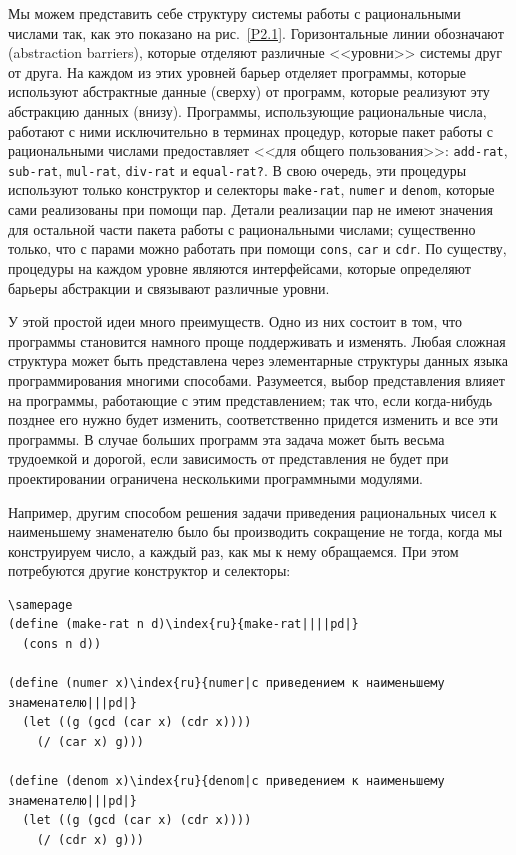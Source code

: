 Мы можем представить себе структуру системы работы с
рациональными числами так, как это показано на рис.~\ref{P2.1}.  Горизонтальные линии обозначают 
 (abstraction barriers), которые
отделяют различные <<уровни>> системы друг от друга.  На каждом из
этих уровней барьер отделяет программы, которые используют абстрактные 
данные (сверху) от программ, которые реализуют эту абстракцию данных
(внизу).  Программы, использующие рациональные числа, работают с ними
исключительно в терминах процедур, которые пакет работы с
рациональными числами предоставляет <<для общего пользования>>:
{\tt add-rat}, {\tt sub-rat}, {\tt mul-rat},
{\tt div-rat} и {\tt equal-rat?}.  В свою очередь, эти
процедуры используют только конструктор и  селекторы
{\tt make-rat}, {\tt numer} и
{\tt denom}, которые сами реализованы при помощи пар.  Детали
реализации пар не имеют значения для остальной части
пакета работы с рациональными числами; существенно только, что с
парами можно работать при помощи {\tt cons}, {\tt car} и 
{\tt cdr}.  По существу, процедуры на каждом уровне являются
интерфейсами, которые определяют барьеры абстракции и связывают
различные уровни.

У этой простой идеи много преимуществ.  Одно из них
состоит в том, что программы становится намного проще поддерживать и
изменять.  Любая сложная структура может быть представлена через
элементарные структуры данных языка программирования многими
способами.  Разумеется, выбор представления влияет на программы,
работающие с этим представлением; так что, если когда-нибудь позднее
его нужно будет изменить, соответственно придется изменить и 
все эти программы.  В случае больших программ эта задача может быть
весьма трудоемкой и дорогой, если зависимость от представления не
будет при проектировании ограничена несколькими программными
модулями.

%
%
Например, другим
способом решения задачи приведения 
рациональных чисел к наименьшему знаменателю было бы производить
сокращение не тогда, когда мы конструируем число, а каждый раз, как мы 
к нему обращаемся.  При этом потребуются другие конструктор и
селекторы: 

\begin{Verbatim}[fontsize=\small]
\samepage
(define (make-rat n d)\index{ru}{make-rat||||pd|}
  (cons n d))

(define (numer x)\index{ru}{numer|с приведением к наименьшему знаменателю|||pd|}
  (let ((g (gcd (car x) (cdr x))))
    (/ (car x) g)))

(define (denom x)\index{ru}{denom|с приведением к наименьшему знаменателю|||pd|}
  (let ((g (gcd (car x) (cdr x))))
    (/ (cdr x) g)))
\end{Verbatim}

